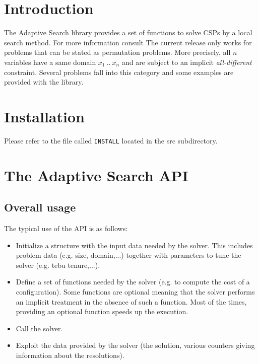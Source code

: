 \documentclass{article}
\begin{document}


\section{Introduction}

The Adaptive Search library provides a set of functions to solve CSPs by a
local search method. For more information consult \cite{saga01} The current
release only works for problems that can be stated as permutation
problems. More precisely, all $n$ variables have a same domain $x_1~..~x_n$
and are subject to an implicit \textit{all-different} constraint. Several
problems fall into this category and some examples are provided with the
library.

\section{Installation}

Please refer to the file called \texttt{INSTALL} located in the src subdirectory.

\section{The Adaptive Search API}

\subsection{Overall usage}

The typical use of the API is as follows:

\begin{itemize}

\item Initialize a structure with the input data needed by the solver. This
  includes problem data (e.g. size, domain,...) together with parameters to
  tune the solver (e.g. tebu tenure,...).

\item Define a set of functions needed by the solver (e.g. to compute the
  cost of a configuration). Some functions are optional meaning that the
  solver performs an implicit treatment in the absence of such a
  function. Most of the times, providing an optional function speeds up the
  execution.

\item Call the solver.

\item Exploit the data provided by the solver (the solution, various counters
  giving information about the resolutions).

\end{itemize}
\end{document}
